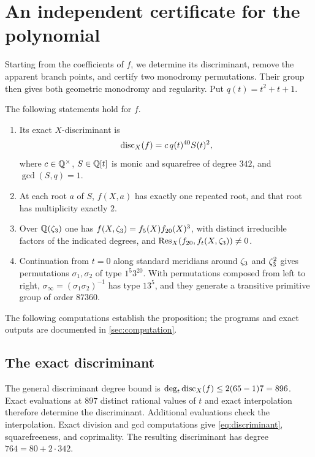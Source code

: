 \section{An independent certificate for the polynomial}\label{sec:certificate}

Starting from the coefficients of $f$, we determine its discriminant,
remove the apparent branch points, and certify two monodromy permutations.
Their group then gives both geometric monodromy and regularity.
Put $q(t)=t^2+t+1$.

\begin{proposition}\label{prop:certificate}
The following statements hold for $f$.
\begin{enumerate}[label=\textup{(\roman*)},leftmargin=*]
\item Its exact $X$-discriminant is
\begin{equation}\label{eq:discriminant}
 \operatorname{disc}_X(f)=c\,q(t)^{40}S(t)^2,
\end{equation}
where $c\in\mathbb{Q}^\times$, $S\in\mathbb{Q}[t]$ is monic and squarefree of degree
$342$, and $\gcd(S,q)=1$.
\item At each root $a$ of $S$, $f(X,a)$ has exactly one repeated root,
and that root has multiplicity exactly $2$.
\item Over $\mathbb{Q}(\zeta_3)$ one has
$f(X,\zeta_3)=f_5(X)f_{20}(X)^3$, with distinct irreducible factors of the
indicated degrees, and
$\operatorname{Res}_X(f_{20},f_t(X,\zeta_3))\ne0$.
\item Continuation from $t=0$ along standard meridians around $\zeta_3$
and $\zeta_3^2$ gives permutations $\sigma_1,\sigma_2$ of type
$1^5 3^{20}$. With permutations composed from left to right,
$\sigma_\infty=(\sigma_1\sigma_2)^{-1}$ has type $13^5$, and they generate a
transitive primitive group of order $87360$.
\end{enumerate}
\end{proposition}

The following computations establish the proposition; the programs and
exact outputs are documented in \cref{sec:computation}.

\subsection{The exact discriminant}

The general discriminant degree bound is
$\deg_t\operatorname{disc}_X(f)\leq2(65-1)7=896$.
Exact evaluations at $897$ distinct rational values of $t$ and exact
interpolation therefore determine the discriminant. Additional evaluations
check the interpolation.
Exact division and gcd computations give \eqref{eq:discriminant},
squarefreeness, and coprimality. The resulting discriminant has degree
$764=80+2\cdot342$.

